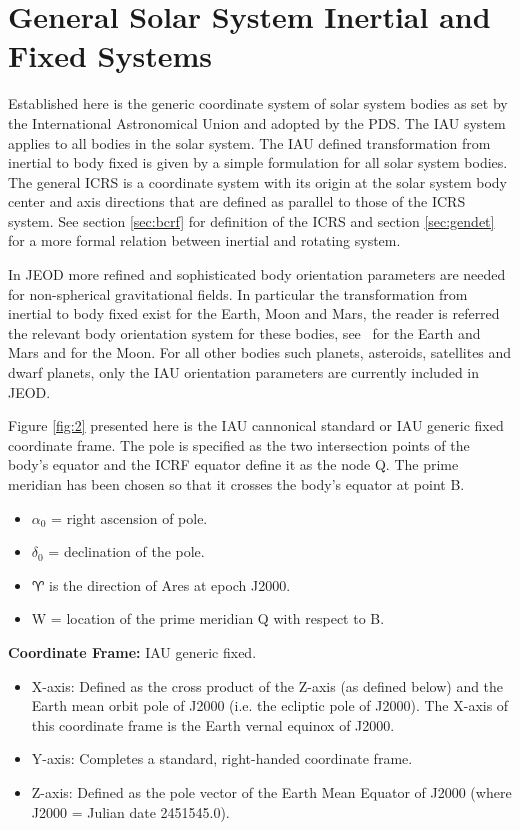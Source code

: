 
\section{General Solar System Inertial and Fixed Systems} \label{sec:gen} 
Established here is the generic coordinate system of solar system bodies as set by the International Astronomical Union \cite{IAU2006} and adopted by the PDS.  The IAU system applies to all bodies in the solar system. The IAU defined transformation from inertial to body fixed is given by a simple formulation for all solar system bodies. The general ICRS is a coordinate system with its origin at the solar system body center and axis directions that are defined as parallel to those of the ICRS system. See section \ref{sec:bcrf} for definition of the ICRS and section \ref{sec:gendet} for a more formal relation between inertial and rotating system.

In JEOD more refined and sophisticated body orientation parameters are needed for non-spherical gravitational fields. In particular the transformation from inertial to body fixed exist for the Earth, Moon and Mars, the reader is referred the relevant body orientation system for these bodies, see \  for the Earth and Mars and  for the Moon.  For all other bodies such planets, asteroids, satellites and dwarf planets, only the IAU orientation parameters are currently included in JEOD. 

Figure \ref{fig:2} presented here is the IAU cannonical standard or IAU generic fixed coordinate frame. The pole is specified as the two intersection points of the body's equator and the ICRF equator define it as the node Q. The prime meridian has been chosen so that it crosses the body's equator at point B.\\
\begin{itemize}
\item $\alpha_0$ = right ascension of pole.\\
\item $\delta_0$ = declination of the pole.\\
\item $\aries$  is the direction of Ares at epoch J2000.\\
\item W = location of the prime meridian Q with respect to B.\\
\end{itemize}
\textbf{Coordinate Frame: } IAU generic fixed.

\begin{itemize}
\item X-axis: Defined as the cross product of the Z-axis (as defined below) and the Earth mean orbit pole of J2000 (i.e. the ecliptic pole of J2000). The X-axis of this coordinate frame is the
Earth vernal equinox of J2000.
\item Y-axis: Completes a standard, right-handed coordinate frame.
\item Z-axis: Defined as the pole vector of the Earth Mean Equator of J2000
(where J2000 = Julian date 2451545.0).
\end{itemize}


